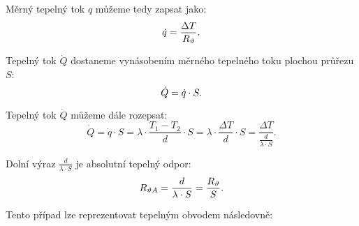 \documentclass{article}
\begin{document}
Měrný tepelný tok $q$ můžeme tedy zapsat jako:
\begin{equation}
    \dot{q} = \frac{\Delta T}{R_{\vartheta}}.
    \unit{(\ueqWandMinvsq)}
\end{equation}

Tepelný tok $\dot{Q}$ dostaneme vynásobením měrného tepelného toku plochou průřezu $S$:
\begin{equation}
    \dot{Q} = \dot{q} \cdot S.
    \unit{(\ueqW)}
\end{equation}

Tepelný tok $\dot{Q}$ můžeme dále rozepsat:
$$
    \dot{Q} = \dot{q} \cdot S = \lambda \cdot \frac{T_1 - T_2}{d} \cdot S = \lambda \cdot \frac{\Delta T}{d} \cdot S = \frac{\Delta T}{\frac{d}{\lambda \cdot S}}.
$$

Dolní výraz $\frac{d}{\lambda \cdot S}$ je absolutní tepelný odpor:
\begin{equation}
    R_{\vartheta A} = \frac{d}{\lambda \cdot S} = \frac{R_{\vartheta}}{S}.
    \unit{(\ueqKandWinv)}
\end{equation}

Tento případ lze reprezentovat tepelným obvodem následovně:
\begin{center}
\end{center}
\end{document}
